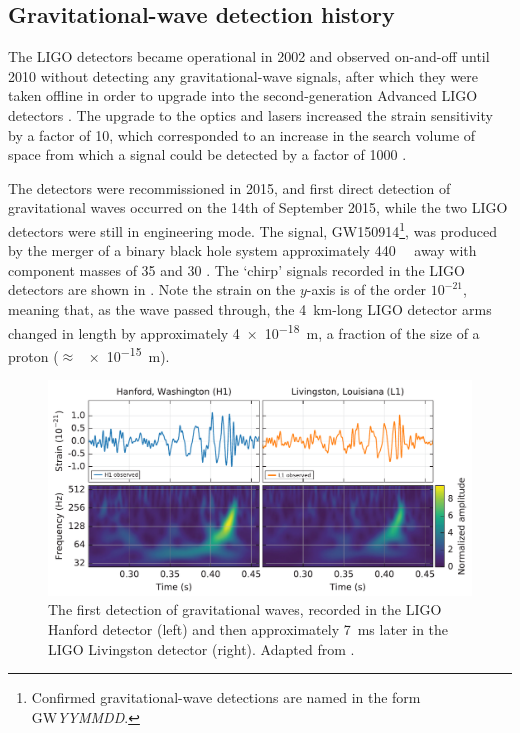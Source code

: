 \subsection{Gravitational-wave detection history}
\label{sec:gw_detections}
\begin{colsection}

The LIGO detectors became operational in 2002 and observed on-and-off until 2010 without detecting any gravitational-wave signals, after which they were taken offline in order to upgrade into the second-generation Advanced LIGO detectors \citep{LIGO_initial, LIGO_advanced}. The upgrade to the optics and lasers increased the strain sensitivity by a factor of 10, which corresponded to an increase in the search volume of space from which a signal could be detected by a factor of 1000 \citep{LIGO_advanced2}.

The detectors were recommissioned in 2015, and first direct detection of gravitational waves occurred on the 14th of September 2015, while the two LIGO detectors were still in engineering mode. The signal, GW150914\footnote{Confirmed gravitational-wave detections are named in the form GW\textit{YYMMDD}.}, was produced by the merger of a binary black hole system approximately \SI{440}{\mega\parsec} away with component masses of \SI{35}{\solarmass} and \SI{30}{\solarmass} \citep{GW150914}. The `chirp' signals recorded in the LIGO detectors are shown in . Note the strain on the $y$-axis is of the order $10^{-21}$, meaning that, as the wave passed through, the \SI{4}{\kilo\metre}-long LIGO detector arms changed in length by approximately \SI{4e-18}{\metre}, a fraction of the size of a proton ($\approx$ \SI{e-15}{\metre}).

\begin{figure}[t]
    \begin{center}
        \includegraphics[width=\linewidth]{images/chirp2.pdf}
    \end{center}
    \caption[The first detection of gravitational waves]{
        The first detection of gravitational waves, recorded in the LIGO Hanford detector (left) and then approximately \SI{7}{\milli\second} later in the LIGO Livingston detector (right). Adapted from \citet{GW150914}.
        }\label{fig:chirp}
\end{figure}


\end{colsection}
